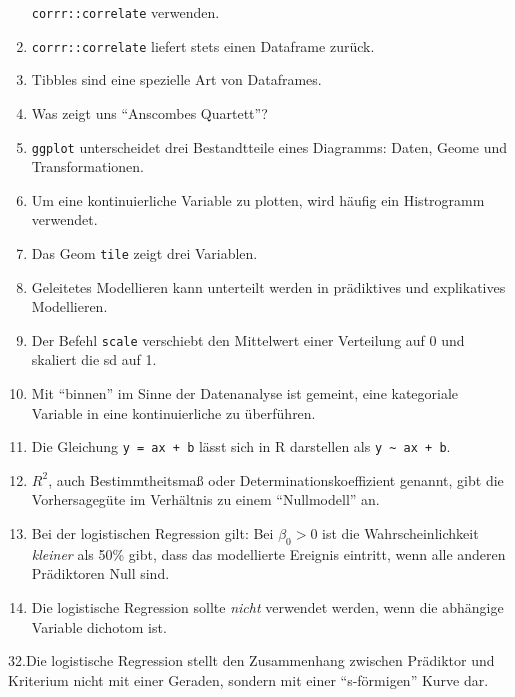 \documentclass[12pt,ngerman,]{book}
\theoremstyle{definition}
\theoremstyle{definition}
\theoremstyle{remark}
\begin{document}
\begin{enumerate}
  \texttt{corrr::correlate} verwenden.
\item
  \texttt{corrr::correlate} liefert stets einen Dataframe zurück.
\item
  Tibbles sind eine spezielle Art von Dataframes.
\item
  Was zeigt uns ``Anscombes Quartett''?
\item
  \texttt{ggplot} unterscheidet drei Bestandtteile eines Diagramms:
  Daten, Geome und Transformationen.
\item
  Um eine kontinuierliche Variable zu plotten, wird häufig ein
  Histrogramm verwendet.
\item
  Das Geom \texttt{tile} zeigt drei Variablen.
\item
  Geleitetes Modellieren kann unterteilt werden in prädiktives und
  explikatives Modellieren.
\item
  Der Befehl \texttt{scale} verschiebt den Mittelwert einer Verteilung
  auf 0 und skaliert die sd auf 1.
\item
  Mit ``binnen'' im Sinne der Datenanalyse ist gemeint, eine kategoriale
  Variable in eine kontinuierliche zu überführen.
\item
  Die Gleichung \texttt{y\ =\ ax\ +\ b} lässt sich in R darstellen als
  \texttt{y\ \textasciitilde{}\ ax\ +\ b}.
\item
  \(R^2\), auch Bestimmtheitsmaß oder Determinationskoeffizient genannt,
  gibt die Vorhersagegüte im Verhältnis zu einem ``Nullmodell'' an.
\item
  Bei der logistischen Regression gilt: Bei \(\beta_0>0\) ist die
  Wahrscheinlichkeit \emph{kleiner} als 50\% gibt, dass das modellierte
  Ereignis eintritt, wenn alle anderen Prädiktoren Null sind.
\item
  Die logistische Regression sollte \emph{nicht} verwendet werden, wenn
  die abhängige Variable dichotom ist.
\end{enumerate}

32.Die logistische Regression stellt den Zusammenhang zwischen Prädiktor
und Kriterium nicht mit einer Geraden, sondern mit einer ``s-förmigen''
Kurve dar.
\end{document}
